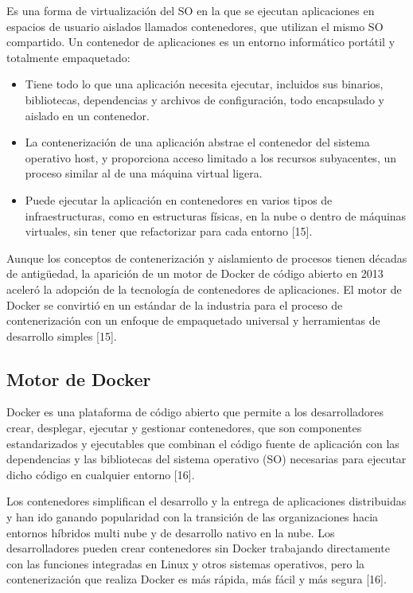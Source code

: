 \documentclass[12pt]{article}
\begin{document}
Es una forma de virtualización del SO en la que se ejecutan aplicaciones en 
espacios de usuario aislados llamados contenedores, que utilizan el mismo SO 
compartido. Un contenedor de aplicaciones es un entorno informático portátil y 
totalmente empaquetado:

\begin{itemize}
    \item Tiene todo lo que una aplicación necesita ejecutar, incluidos sus 
        binarios, bibliotecas, dependencias y archivos de configuración, todo 
        encapsulado y aislado en un contenedor.
    \item La contenerización de una aplicación abstrae el contenedor del 
        sistema operativo host, y proporciona acceso limitado a los recursos 
        subyacentes, un proceso similar al de una máquina virtual ligera.
    \item Puede ejecutar la aplicación en contenedores en varios tipos de 
        infraestructuras, como en estructuras físicas, en la nube o dentro de 
        máquinas virtuales, sin tener que refactorizar para cada entorno [15].
\end{itemize}

Aunque los conceptos de contenerización y aislamiento de procesos tienen 
décadas de antigüedad, la aparición de un motor de Docker de código abierto en 
2013 aceleró la adopción de la tecnología de contenedores de aplicaciones. 
El motor de Docker se convirtió en un estándar de la industria para el proceso 
de contenerización con un enfoque de empaquetado universal y herramientas de 
desarrollo simples [15].

\subsection*{Motor de Docker}

Docker es una plataforma de código abierto que permite a los desarrolladores 
crear, desplegar, ejecutar y gestionar contenedores, que son componentes 
estandarizados y ejecutables que combinan el código fuente de aplicación con 
las dependencias y las bibliotecas del sistema operativo (SO) necesarias para 
ejecutar dicho código en cualquier entorno [16].

Los contenedores simplifican el desarrollo y la entrega de aplicaciones 
distribuidas y han ido ganando popularidad con la transición de las organizaciones 
hacia entornos híbridos multi nube y de desarrollo nativo en la nube.  
Los desarrolladores pueden crear contenedores sin Docker trabajando directamente 
con las funciones integradas en Linux y otros sistemas operativos, pero la 
contenerización que realiza Docker es más rápida, más fácil y más segura [16].
\end{document}
